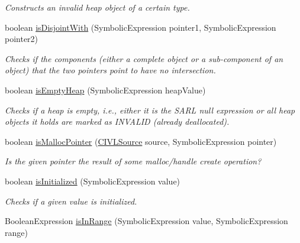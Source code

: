 \begin{DoxyCompactItemize}
\begin{DoxyCompactList}\small\item\em Constructs an invalid heap object of a certain type. \end{DoxyCompactList}\item 
boolean \hyperlink{classedu_1_1udel_1_1cis_1_1vsl_1_1civl_1_1dynamic_1_1common_1_1CommonSymbolicUtility_ad7345c1026c2af610403e39b79d1dca0}{is\+Disjoint\+With} (Symbolic\+Expression pointer1, Symbolic\+Expression pointer2)
\begin{DoxyCompactList}\small\item\em Checks if the components (either a complete object or a sub-\/component of an object) that the two pointers point to have no intersection. \end{DoxyCompactList}\item 
boolean \hyperlink{classedu_1_1udel_1_1cis_1_1vsl_1_1civl_1_1dynamic_1_1common_1_1CommonSymbolicUtility_aed498b2ad5be8db07e7fedd13bc7a15a}{is\+Empty\+Heap} (Symbolic\+Expression heap\+Value)
\begin{DoxyCompactList}\small\item\em Checks if a heap is empty, i.\+e., either it is the S\+A\+R\+L null expression or all heap objects it holds are marked as I\+N\+V\+A\+L\+I\+D (already deallocated). \end{DoxyCompactList}\item 
boolean \hyperlink{classedu_1_1udel_1_1cis_1_1vsl_1_1civl_1_1dynamic_1_1common_1_1CommonSymbolicUtility_a10700ebb579beffae9ccda4725cf36bb}{is\+Malloc\+Pointer} (\hyperlink{interfaceedu_1_1udel_1_1cis_1_1vsl_1_1civl_1_1model_1_1IF_1_1CIVLSource}{C\+I\+V\+L\+Source} source, Symbolic\+Expression pointer)
\begin{DoxyCompactList}\small\item\em Is the given pointer the result of some malloc/handle create operation? \end{DoxyCompactList}\item 
boolean \hyperlink{classedu_1_1udel_1_1cis_1_1vsl_1_1civl_1_1dynamic_1_1common_1_1CommonSymbolicUtility_a025ea919fac4a00e39ec09cc14d6c522}{is\+Initialized} (Symbolic\+Expression value)
\begin{DoxyCompactList}\small\item\em Checks if a given value is initialized. \end{DoxyCompactList}\item 
Boolean\+Expression \hyperlink{classedu_1_1udel_1_1cis_1_1vsl_1_1civl_1_1dynamic_1_1common_1_1CommonSymbolicUtility_abe50a9361a8a895d74772838afc688d3}{is\+In\+Range} (Symbolic\+Expression value, Symbolic\+Expression range)

\end{DoxyCompactItemize}

